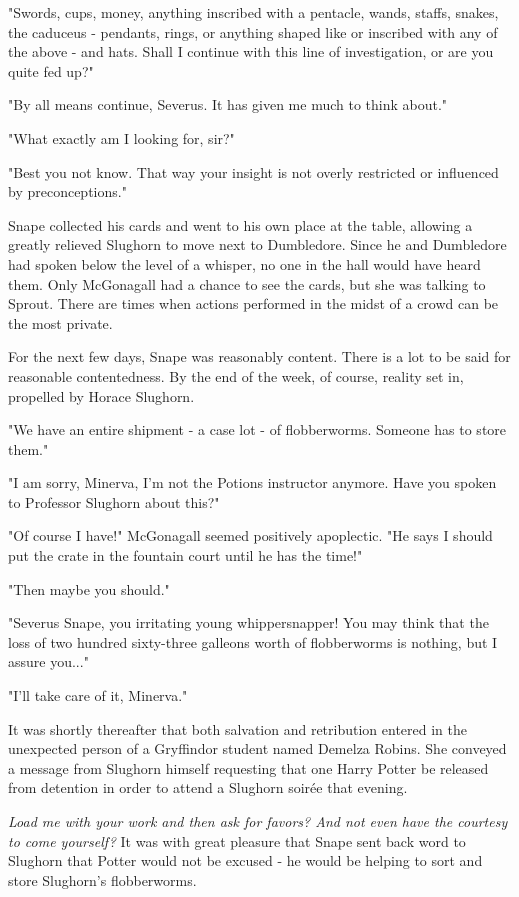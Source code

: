 \documentclass[a4paper,11pt]{article}
\begin{document}
"Swords, cups, money, anything inscribed with a pentacle, wands, staffs, snakes, the caduceus - pendants, rings, or anything shaped like or inscribed with any of the above - and hats. Shall I continue with this line of investigation, or are you quite fed up?"

"By all means continue, Severus. It has given me much to think about."

"What exactly am I looking for, sir?"

"Best you not know. That way your insight is not overly restricted or influenced by preconceptions."

Snape collected his cards and went to his own place at the table, allowing a greatly relieved Slughorn to move next to Dumbledore. Since he and Dumbledore had spoken below the level of a whisper, no one in the hall would have heard them. Only McGonagall had a chance to see the cards, but she was talking to Sprout. There are times when actions performed in the midst of a crowd can be the most private.

For the next few days, Snape was reasonably content. There is a lot to be said for reasonable contentedness. By the end of the week, of course, reality set in, propelled by Horace Slughorn.

"We have an entire shipment - a case lot - of flobberworms. Someone has to store them."

"I am sorry, Minerva, I'm not the Potions instructor anymore. Have you spoken to Professor Slughorn about this?"

"Of course I have!" McGonagall seemed positively apoplectic. "He says I should put the crate in the fountain court until he has the time!"

"Then maybe you should."

"Severus Snape, you irritating young whippersnapper! You may think that the loss of two hundred sixty-three galleons worth of flobberworms is nothing, but I assure you..."

"I'll take care of it, Minerva."

It was shortly thereafter that both salvation and retribution entered in the unexpected person of a Gryffindor student named Demelza Robins. She conveyed a message from Slughorn himself requesting that one Harry Potter be released from detention in order to attend a Slughorn soirée that evening.

\emph{Load me with your work and then ask for favors? And not even have the courtesy to come yourself?} It was with great pleasure that Snape sent back word to Slughorn that Potter would not be excused - he would be helping to sort and store Slughorn's flobberworms.
\end{document}
